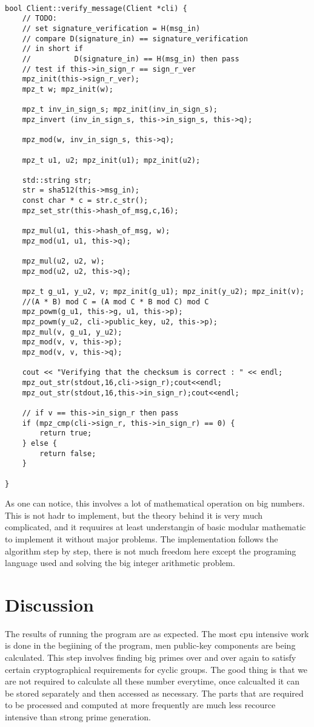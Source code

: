 \documentclass[12pt]{report}
\begin{document}
\begin{lstlisting}[caption=verification step of DSS with SHA512]

bool Client::verify_message(Client *cli) {
	// TODO:
	// set signature_verification = H(msg_in)
	// compare D(signature_in) == signature_verification
	// in short if
	//			D(signature_in) == H(msg_in) then pass
	// test if this->in_sign_r == sign_r_ver
	mpz_init(this->sign_r_ver);
	mpz_t w; mpz_init(w);

	mpz_t inv_in_sign_s; mpz_init(inv_in_sign_s);
	mpz_invert (inv_in_sign_s, this->in_sign_s, this->q);

	mpz_mod(w, inv_in_sign_s, this->q);

	mpz_t u1, u2; mpz_init(u1); mpz_init(u2);

	std::string str;
	str = sha512(this->msg_in);
	const char * c = str.c_str();
	mpz_set_str(this->hash_of_msg,c,16);

	mpz_mul(u1, this->hash_of_msg, w);
	mpz_mod(u1, u1, this->q);

	mpz_mul(u2, u2, w);
	mpz_mod(u2, u2, this->q);

	mpz_t g_u1, y_u2, v; mpz_init(g_u1); mpz_init(y_u2); mpz_init(v);
	//(A * B) mod C = (A mod C * B mod C) mod C
	mpz_powm(g_u1, this->g, u1, this->p);
	mpz_powm(y_u2, cli->public_key, u2, this->p);
	mpz_mul(v, g_u1, y_u2);
	mpz_mod(v, v, this->p);
	mpz_mod(v, v, this->q);

	cout << "Verifying that the checksum is correct : " << endl;
	mpz_out_str(stdout,16,cli->sign_r);cout<<endl;
	mpz_out_str(stdout,16,this->in_sign_r);cout<<endl;

	// if v == this->in_sign_r then pass
	if (mpz_cmp(cli->sign_r, this->in_sign_r) == 0) {
		return true;
	} else {
		return false;
	}

}
\end{lstlisting}

As one can notice, this involves a lot of mathematical operation on big numbers. This is not hadr to implement, but the theory behind it is very much complicated, and it requuires at least understangin of basic modular mathematic to implement it without major problems. The implementation follows the algorithm step by step, there is not much freedom here except the programing language used and solving the big integer arithmetic problem.


\section{Discussion}
The results of running the program are as expected. The most cpu intensive work is done in the begiining of the program, men public-key components are being calculated. This step involves finding big primes over and over again to satisfy certain cryptographical requirements for cyclic groups. The good thing is that we are not required to calculate all these number everytime, once calcualted it can be stored separately and then accessed as necessary. The parts that are required to be processed and computed at more frequently are much less recource intensive than strong prime generation. 
\end{document}
